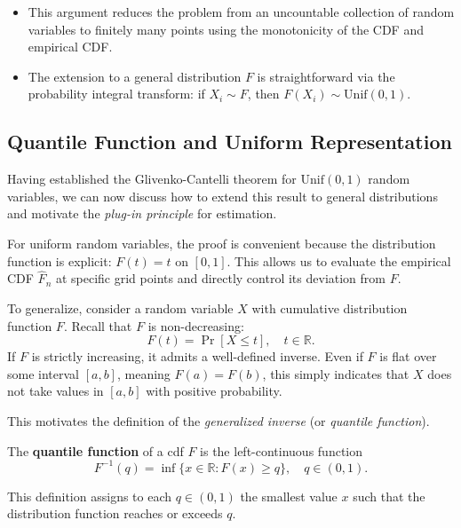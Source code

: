 \begin{remark}[]
\leavevmode    
\begin{itemize}
    \item This argument reduces the problem from an uncountable collection of random variables 
    to finitely many points using the monotonicity of the CDF and empirical CDF.
    \item The extension to a general distribution $F$ is straightforward via the probability 
    integral transform: if $X_i \sim F$, then $F(X_i) \sim \mathrm{Unif}(0,1)$.
\end{itemize}
\end{remark}

\subsection{Quantile Function and Uniform Representation}%
\label{sub:Quantile Function and Uniform Representation}

Having established the Glivenko-Cantelli theorem for \(\mathrm{Unif}(0,1)\) random variables, 
we can now discuss how to extend this result to general distributions and motivate the 
\emph{plug-in principle} for estimation.

\medskip

For uniform random variables, the proof is convenient because the distribution function 
is explicit: \(F(t) = t\) on \([0,1]\). This allows us to evaluate the empirical CDF 
\(\hat F_n\) at specific grid points and directly control its deviation from \(F\).

\medskip

To generalize, consider a random variable \(X\) with cumulative distribution function \(F\). 
Recall that \(F\) is non-decreasing:
\[
F(t) = \Pr[X \le t], \quad t \in \mathbb{R}.
\]
If \(F\) is strictly increasing, it admits a well-defined inverse. Even if \(F\) is flat 
over some interval \([a,b]\), meaning \(F(a) = F(b)\), this simply indicates that \(X\) 
does not take values in \([a,b]\) with positive probability. 

\medskip

This motivates the definition of the \emph{generalized inverse} (or \emph{quantile function}).

The \textbf{quantile function} of a cdf \(F\) is the left-continuous function
\[
F^{-1}(q) = \inf \{ x \in \mathbb{R} : F(x) \ge q \}, \quad q \in (0,1).
\]

This definition assigns to each \(q \in (0,1)\) the smallest value \(x\) such that 
the distribution function reaches or exceeds \(q\). 

